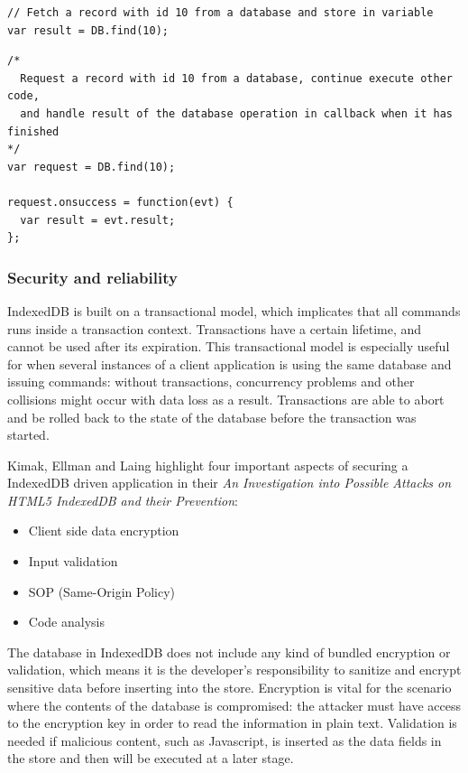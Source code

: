 \begin{Code}
\begin{lstlisting}[caption=Synchronous call]
// Fetch a record with id 10 from a database and store in variable
var result = DB.find(10);
\end{lstlisting}

\begin{lstlisting}[caption=Asynchronous call]
/*
  Request a record with id 10 from a database, continue execute other code,
  and handle result of the database operation in callback when it has finished
*/
var request = DB.find(10);

request.onsuccess = function(evt) {
  var result = evt.result;
};
\end{lstlisting}
\end{Code}

\subsubsection{Security and reliability}
\label{subsec:security}
IndexedDB is built on a transactional model, which implicates that all commands runs inside a transaction context. Transactions have a certain lifetime, and cannot be used after its expiration. This transactional model is especially useful for when several instances of a client application is using the same database and issuing commands: without transactions, concurrency problems and other collisions might occur with data loss as a result. Transactions are able to abort and be rolled back to the state of the database before the transaction was started.

Kimak, Ellman and Laing highlight four important aspects of securing a IndexedDB driven application in their \emph{An Investigation into Possible Attacks on HTML5 IndexedDB and their Prevention}\cite{IndexedDBSecurity:2012:Online}:

\begin{itemize}
  \item Client side data encryption
  \item Input validation
  \item SOP (Same-Origin Policy)
  \item Code analysis
\end{itemize}

The database in IndexedDB does not include any kind of bundled encryption or validation, which means it is the developer's responsibility to sanitize and encrypt sensitive data before inserting into the store. Encryption is vital for the scenario where the contents of the database is compromised: the attacker must have access to the encryption key in order to read the information in plain text. Validation is needed if malicious content, such as Javascript, is inserted as the data fields in the store and then will be executed at a later stage.

